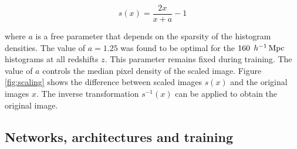 \documentclass[twocolumn]{article}
\numberwithin{equation}{section}
\begin{document}
\begin{equation}
    s(x) = \frac{2x}{x+a} - 1
\end{equation}

where $a$ is a free parameter that depends on the sparsity of the histogram densities. The value of $a=1.25$ was found to be optimal for the $160 \:  \: h^{-1} \,\textup{Mpc}$ histograms at all redshifts $z$. This parameter remains fixed during training. The value of $a$ controls the median pixel density of the scaled image. Figure \ref{fig:scaling} shows the difference between scaled images $s(x)$ and the original images $x$. The inverse transformation $s^{-1}(x)$ can be applied to obtain the original image. 


\subsection{Networks, architectures and training}\label{training}

\end{document}

